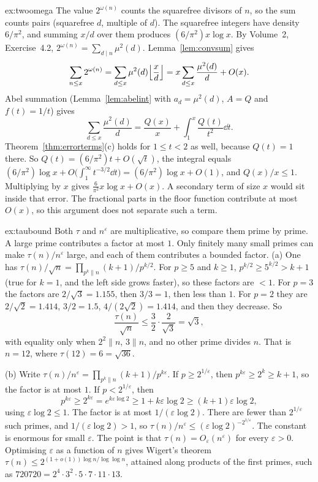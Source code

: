\begin{solution}{ex:twoomega}
\idea The value $2^{\omega(n)}$ counts the squarefree divisors of $n$, so the sum counts pairs (squarefree $d$, multiple of $d$). The squarefree integers have density $6/\pi^2$, and summing $x/d$ over them produces $(6/\pi^2)x\log x$.
\writeup By Volume~2, Exercise~4.2, $2^{\omega(n)}=\sum_{d\mid n}\mu^2(d)$. Lemma~\ref{lem:convsum} gives
\[
\sum_{n\le x}2^{\omega(n)}=\sum_{d\le x}\mu^2(d)\Bigl\lfloor\frac xd\Bigr\rfloor=x\sum_{d\le x}\frac{\mu^2(d)}d+O(x).
\]
Abel summation (Lemma~\ref{lem:abelint} with $a_d=\mu^2(d)$, $A=Q$ and $f(t)=1/t$) gives
\[
\sum_{d\le x}\frac{\mu^2(d)}d=\frac{Q(x)}x+\int_1^x\frac{Q(t)}{t^2}\dd t.
\]
Theorem~\ref{thm:errorterms}(c) holds for $1\le t<2$ as well, because $Q(t)=1$ there. So $Q(t)=(6/\pi^2)t+O(\sqrt t)$, the integral equals $(6/\pi^2)\log x+O\bigl(\int_1^\infty t^{-3/2}\dd t\bigr)=(6/\pi^2)\log x+O(1)$, and $Q(x)/x\le1$. Multiplying by $x$ gives $\frac6{\pi^2}x\log x+O(x)$. A secondary term of size $x$ would sit inside that error. The fractional parts in the floor function contribute at most $O(x)$, so this argument does not separate such a term.
\end{solution}

\begin{solution}{ex:taubound}
\idea Both $\tau$ and $n^\varepsilon$ are multiplicative, so compare them prime by prime. A large prime contributes a factor at most $1$. Only finitely many small primes can make $\tau(n)/n^\varepsilon$ large, and each of them contributes a bounded factor.
\writeup (a) One has $\tau(n)/\sqrt n=\prod_{p^k\|n}(k+1)/p^{k/2}$. For $p\ge5$ and $k\ge1$, $p^{k/2}\ge5^{k/2}>k+1$ (true for $k=1$, and the left side grows faster), so these factors are $<1$. For $p=3$ the factors are $2/\sqrt3=1.155$, then $3/3=1$, then less than $1$. For $p=2$ they are $2/\sqrt2=1.414$, $3/2=1.5$, $4/(2\sqrt2)=1.414$, and then they decrease. So
\[
\frac{\tau(n)}{\sqrt n}\le\frac32\cdot\frac2{\sqrt3}=\sqrt3,
\]
with equality only when $2^2\|n$, $3\|n$, and no other prime divides $n$. That is $n=12$, where $\tau(12)=6=\sqrt{36}$.

(b) Write $\tau(n)/n^\varepsilon=\prod_{p^k\|n}(k+1)/p^{k\varepsilon}$. If $p\ge2^{1/\varepsilon}$, then $p^{k\varepsilon}\ge2^k\ge k+1$, so the factor is at most $1$. If $p<2^{1/\varepsilon}$, then
\[
p^{k\varepsilon}\ge2^{k\varepsilon}=e^{k\varepsilon\log2}\ge1+k\varepsilon\log2\ge(k+1)\varepsilon\log2,
\]
using $\varepsilon\log2\le1$. The factor is at most $1/(\varepsilon\log2)$. There are fewer than $2^{1/\varepsilon}$ such primes, and $1/(\varepsilon\log2)>1$, so $\tau(n)/n^\varepsilon\le(\varepsilon\log2)^{-2^{1/\varepsilon}}$. The constant is enormous for small $\varepsilon$. The point is that $\tau(n)=O_\varepsilon(n^\varepsilon)$ for every $\varepsilon>0$. Optimising $\varepsilon$ as a function of $n$ gives Wigert's theorem $\tau(n)\le2^{(1+o(1))\log n/\log\log n}$, attained along products of the first primes, such as $720720=2^4\cdot3^2\cdot5\cdot7\cdot11\cdot13$.
\end{solution}

